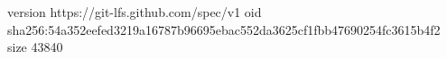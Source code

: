 version https://git-lfs.github.com/spec/v1
oid sha256:54a352eefed3219a16787b96695ebac552da3625cf1fbb47690254fc3615b4f2
size 43840
